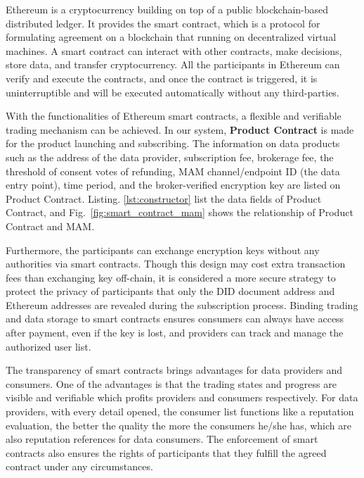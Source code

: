 \documentclass[conference]{IEEEtran}
\begin{document}
Ethereum is a cryptocurrency building on top of a public blockchain-based distributed ledger. It provides the smart contract, which is a protocol for formulating agreement on a blockchain that running on decentralized virtual machines. A smart contract can interact with other contracts, make decisions, store data, and transfer cryptocurrency. All the participants in Ethereum can verify and execute the contracts, and once the contract is triggered, it is uninterruptible and will be executed automatically without any third-parties.

With the functionalities of Ethereum smart contracts, a flexible and verifiable trading mechanism can be achieved. In our system, \textbf{Product Contract} is made for the product launching and subscribing. The information on data products such as the address of the data provider, subscription fee, brokerage fee, the threshold of consent votes of refunding, MAM channel/endpoint ID (the data entry point), time period, and the broker-verified encryption key are listed on Product Contract. Listing. \ref{lst:constructor} list the data fields of Product Contract, and Fig.~\ref{fig:smart_contract_mam} shows the relationship of Product Contract and MAM.

Furthermore, the participants can exchange encryption keys without any authorities via smart contracts. Though this design may cost extra transaction fees than exchanging key off-chain, it is considered a more secure strategy to protect the privacy of participants that only the DID document address and Ethereum addresses are revealed during the subscription process. Binding trading and data storage to smart contracts ensures consumers can always have access after payment, even if the key is lost, and providers can track and manage the authorized user list.

The transparency of smart contracts brings advantages for data providers and consumers. One of the advantages is that the trading states and progress are visible and verifiable which profits providers and consumers respectively. For data providers, with every detail opened, the consumer list functions like a reputation evaluation, the better the quality the more the consumers he/she has, which are also reputation references for data consumers. The enforcement of smart contracts also ensures the rights of participants that they fulfill the agreed contract under any circumstances.
\end{document}
